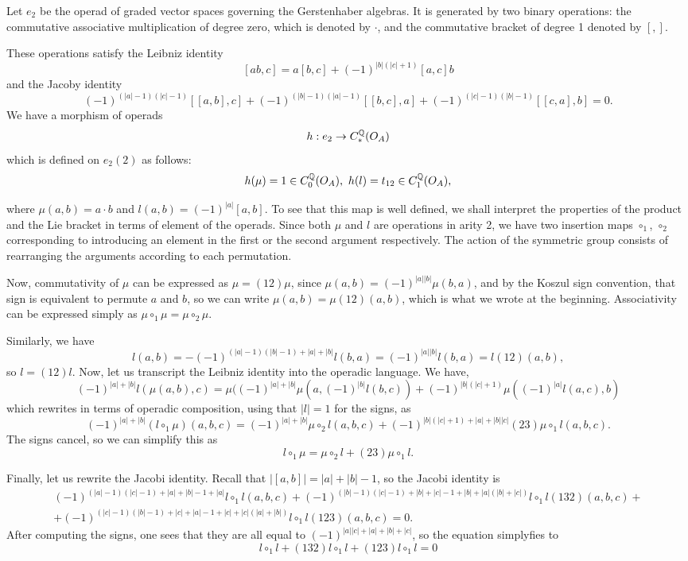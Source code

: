 \documentclass[TFM.tex]{subfiles}
\begin{document}
Let $e_2$ be the operad of graded vector spaces governing the Gerstenhaber algebras.
It is generated by two binary operations: the commutative associative multiplication of degree zero, which is denoted by $\cdot$, and the commutative bracket of degree 1 denoted by $[,]$. 

These operations satisfy the Leibniz identity
\[
[ab, c]= a[b, c]+(-1)^{|b|(|c|+1)}[a,c]b
\]
and the Jacoby identity
\[
(-1)^{(|a|-1)(|c|-1)}[[a,b],c]+(-1)^{(|b|-1)(|a|-1)}[[b,c],a]+(-1)^{(|c|-1)(|b|-1)}[[c,a],b]=0.
\]
We have a morphism of operads
\[
h:e_2\to C_*^{\mathbb{Q}}(O_A)
\]
which is defined on $e_2(2)$ as follows:
\[
h(\mu)=1\in C_0^\Q(O_A),\ h(l)=t_{12}\in C_1^\Q(O_A),
\]

where $\mu(a,b)=a\cdot b$ and $l(a,b)=(-1)^{|a|}[a,b]$. To see that this map is well defined, we shall interpret the properties of the product and the Lie bracket in terms of element of the operads. Since both $\mu$ and $l$ are operations in arity 2, we have two insertion maps $\circ_1$, $\circ_2$ corresponding to introducing an element in the first or the second argument respectively. The action of the symmetric group consists of rearranging the arguments according to each permutation.

Now, commutativity of $\mu$ can be expressed as $\mu=(12)\mu$, since $\mu(a,b)=(-1)^{|a||b|}\mu(b,a)$, and by the Koszul sign convention, that sign is equivalent to permute $a$ and $b$, so we can write $\mu(a,b)=\mu(12)(a,b)$, which is what we wrote at the beginning.  Associativity can be expressed simply as $\mu\circ_1\mu=\mu\circ_2\mu$.

Similarly, we have 
\[
l(a,b)=-(-1)^{(|a|-1)(|b|-1)+|a|+|b|}l(b,a)=(-1)^{|a||b|}l(b,a)=l(12)(a,b),
\]
so $l=(12)l$. Now, let us transcript the Leibniz identity into the operadic language. We have, 
\[
(-1)^{|a|+|b|}l(\mu(a,b),c)=\mu((-1)^{|a|+|b|}\mu(a,(-1)^{|b|}l(b,c))+(-1)^{|b|(|c|+1)}\mu((-1)^{|a|}l(a,c),b)
\]
which rewrites in terms of operadic composition, using that $|l|=1$ for the signs, as %
\[
(-1)^{|a|+|b|}(l\circ_1\mu)(a,b,c)=(-1)^{|a|+|b|}\mu\circ_2 l(a,b,c)+(-1)^{|b|(|c|+1)+|a|+|b||c|}(23)\mu\circ_1 l(a,b,c).
\]
The signs cancel, so we can simplify this as
\[
l\circ_1\mu =\mu\circ_2 l +(23)\mu\circ_1 l.
\]

Finally, let us rewrite the Jacobi identity. Recall that $|[a,b]|=|a|+|b|-1$, so the Jacobi identity is
\begin{gather*}
(-1)^{(|a|-1)(|c|-1)+|a|+|b|-1+|a|}l\circ_1 l(a,b,c)+(-1)^{(|b|-1)(|c|-1)+|b|+|c|-1+|b|+|a|(|b|+|c|)}l\circ_1 l(132)(a,b,c)+\\
+(-1)^{(|c|-1)(|b|-1)+|c|+|a|-1+|c|+|c|(|a|+|b|)}l\circ_1 l(123)(a,b,c)=0.
\end{gather*}
After computing the signs, one sees that they are all equal to $(-1)^{|a||c|+|a|+|b|+|c|}$, so the equation simplyfies to
\[
l\circ_1 l+(132)l\circ_1 l+(123)l\circ_1 l=0
\]
\end{document}
